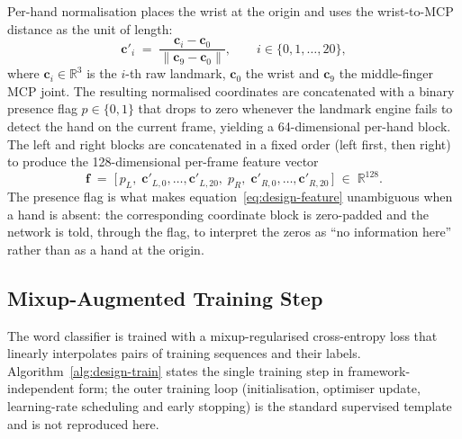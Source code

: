 Per-hand normalisation places the wrist at the origin and uses the
wrist-to-MCP distance as the unit of length:
\begin{equation}
  \mathbf{c}'_i \;=\;
    \frac{\mathbf{c}_i - \mathbf{c}_0}
         {\lVert \mathbf{c}_9 - \mathbf{c}_0 \rVert},
  \qquad i \in \{0, 1, \dots, 20\},
  \label{eq:design-norm}
\end{equation}
where $\mathbf{c}_i \in \mathbb{R}^3$ is the $i$-th raw landmark,
$\mathbf{c}_0$ the wrist and $\mathbf{c}_9$ the middle-finger MCP
joint. The resulting normalised coordinates are concatenated with
a binary presence flag $p \in \{0, 1\}$ that drops to zero
whenever the landmark engine fails to detect the hand on the
current frame, yielding a 64-dimensional per-hand block. The left
and right blocks are concatenated in a fixed order (left first,
then right) to produce the 128-dimensional per-frame feature
vector
\begin{equation}
  \mathbf{f} \;=\; \bigl[\,
    p_L,\; \mathbf{c}'_{L,0}, \dots, \mathbf{c}'_{L,20},\;
    p_R,\; \mathbf{c}'_{R,0}, \dots, \mathbf{c}'_{R,20}
  \,\bigr]
  \;\in\; \mathbb{R}^{128}.
  \label{eq:design-feature}
\end{equation}
The presence flag is what makes
equation~\eqref{eq:design-feature} unambiguous when a hand is
absent: the corresponding coordinate block is zero-padded and the
network is told, through the flag, to interpret the zeros as ``no
information here'' rather than as a hand at the origin.

\subsection{Mixup-Augmented Training Step}
\label{sec:design-algorithm-training}

The word classifier is trained with a mixup-regularised
cross-entropy loss that linearly interpolates pairs of training
sequences and their labels. Algorithm~\ref{alg:design-train}
states the single training step in framework-independent form; the
outer training loop (initialisation, optimiser update,
learning-rate scheduling and early stopping) is the standard
supervised template and is not reproduced here.

